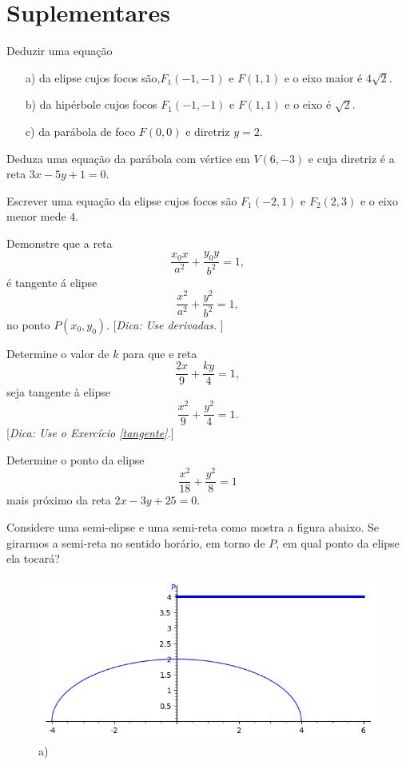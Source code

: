 \section{Suplementares} 
\item
 Deduzir uma equação
 \begin{enumerate}[leftmargin=*]
 \item[a)] da elipse cujos focos são,$F_1(-1,-1)$ e $F(1,1)$ e o eixo maior \'e $4\sqrt{2}$.
 \item[b)] da hipérbole cujos focos $F_1(-1,-1)$ e $F(1,1)$ e o eixo \'e $\sqrt{2}$.
 \item[c)] da parábola de foco $F(0,0)$ e diretriz $y=2$.
 \end{enumerate}
  
\item
 Deduza uma equação da parábola com v\'ertice em $V(6,-3)$ e cuja diretriz \'e a reta $3x-5y+1=0$.
 

  
 \item
  Escrever uma equação da elipse cujos focos  s\~ao $F_1(-2,1)$ e $F_2(2,3)$ e o eixo menor mede $4$.
 

\item\label{tangente}
 Demonstre que a reta
$$\frac{x_0x}{a^2}+\frac{y_0y}{b^2}=1,$$
\'e tangente \'a elipse
$$\frac{x^2}{a^2}+\frac{y^2}{b^2}=1,$$
no ponto $P(x_0,y_0)$. [\textit{Dica: Use derivadas. }] 

\item
 Determine o valor de $k$ para que e reta
$$\frac{2x}{9}+\frac{ky}{4}=1,$$
seja tangente à elipse
$$\frac{x^2}{9}+\frac{y^2}{4}=1.$$
 [\textit{Dica: Use o Exercício \ref{tangente}.}] 

\item
  Determine o ponto da elipse 
 $$\frac{x^2}{18}+\frac{y^2}{8}=1$$
mais próximo da reta $2x -3y+ 25 = 0$.
 

\item
  Considere uma semi-elipse e uma semi-reta como mostra a figura abaixo. Se girarmos a semi-reta no sentido
hor\'ario, em torno de $P$, em qual ponto da elipse ela tocar\'a?
\begin{figure}[H]
 \begin{center}
\includegraphics[scale=0.5]{sections/tmp_DSBM_N.png}
\caption{a)}
\end{center}
 \end{figure}
  

